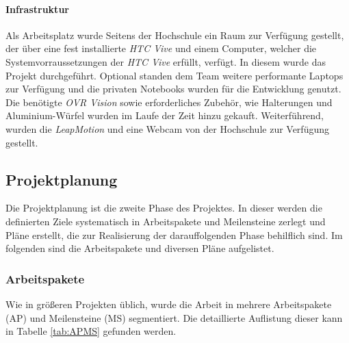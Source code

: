 \paragraph{Infrastruktur} Als Arbeitsplatz wurde Seitens der Hochschule ein Raum zur Verfügung gestellt, der über eine fest installierte \textit{HTC Vive} und einem Computer, welcher die Systemvorraussetzungen der \textit{HTC Vive} erfüllt, verfügt. In diesem wurde das Projekt durchgeführt. Optional standen dem Team weitere performante Laptops zur Verfügung und die privaten Notebooks wurden für die Entwicklung genutzt. Die benötigte \textit{OVR Vision} sowie erforderliches Zubehör, wie Halterungen und Aluminium-Würfel wurden im Laufe der Zeit hinzu gekauft. Weiterführend, wurden die \textit {LeapMotion} und eine Webcam von der Hochschule zur Verfügung gestellt.
\subsection{Projektplanung}
Die Projektplanung ist die zweite Phase des Projektes. In dieser werden die definierten Ziele systematisch in Arbeitspakete und Meilensteine zerlegt und Pläne erstellt, die zur Realisierung der darauffolgenden Phase behilflich sind. Im folgenden sind die Arbeitspakete und diversen Pläne aufgelistet.
\subsubsection{Arbeitspakete}
Wie in größeren Projekten üblich, wurde die Arbeit in mehrere Arbeitspakete (AP) und Meilensteine (MS) segmentiert. Die detaillierte Auflistung dieser kann in Tabelle \ref{tab:APMS} gefunden werden.

